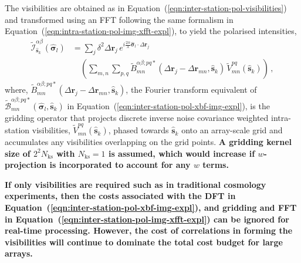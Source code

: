 \documentclass[
  journal=pasa,
  manuscript=article-type,
  year=2020,
  volume=37,
]{cup-journal}
\begin{document}
The visibilities are obtained as in Equation~(\ref{eqn:inter-station-pol-visibilities}) and transformed using an FFT following the same formalism in Equation~(\ref{eqn:intra-station-pol-img-xfft-expl}), to yield the polarised intensities,
\begin{align}
  \widetilde{\mathcal{I}}_{\hat{\boldsymbol{s}}_k}^{\alpha\beta}(\hat{\boldsymbol{\sigma}}_l) &= \sum_j \delta^2 \Delta\boldsymbol{r}_j \, e^{i\frac{2\pi}{\lambda} \hat{\boldsymbol{\sigma}}_l\cdot\Delta\boldsymbol{r}_j} \nonumber\\
  &\quad \left(\sum_{m,n} \sum_{p,q} \widetilde{B}_{mn}^{\alpha\beta;pq*}(\Delta\boldsymbol{r}_j-\Delta\boldsymbol{r}_{mn}, \hat{\boldsymbol{s}}_k) \, \widetilde{V}_{mn}^{pq}(\hat{\boldsymbol{s}}_k) \right) \, , \label{eqn:inter-station-pol-img-xfft-expl}
\end{align}
where, $\widetilde{B}_{mn}^{\alpha\beta;pq*}(\Delta\boldsymbol{r}_j-\Delta\boldsymbol{r}_{mn}, \hat{\boldsymbol{s}}_k)$, the Fourier transform equivalent of $\widetilde{\mathcal{B}}_{mn}^{\alpha\beta;pq*}(\hat{\boldsymbol{\sigma}}_l,\hat{\boldsymbol{s}}_k)$ in Equation~(\ref{eqn:inter-station-pol-xbf-img-expl}), is the gridding operator that projects discrete inverse noise covariance weighted intra-station visibilities, $\widetilde{V}_{mn}^{pq}(\hat{\boldsymbol{s}}_k)$, phased towards $\hat{\boldsymbol{s}}_k$ onto an array-scale grid and accumulates any visibilities overlapping on the grid points. \textbf{A gridding kernel size of $2^2 N_\textrm{ks}$ with $N_\textrm{ks}=1$ is assumed, which would increase if $w$-projection is incorporated to account for any $w$ terms.}

\textbf{If only visibilities are required such as in traditional cosmology experiments, then the costs associated with the DFT in Equation~(\ref{eqn:inter-station-pol-xbf-img-expl}), and gridding and FFT in Equation~(\ref{eqn:inter-station-pol-img-xfft-expl}) can be ignored for real-time processing. However, the cost of correlations in forming the visibilities will continue to dominate the total cost budget for large arrays.}

\end{document}
